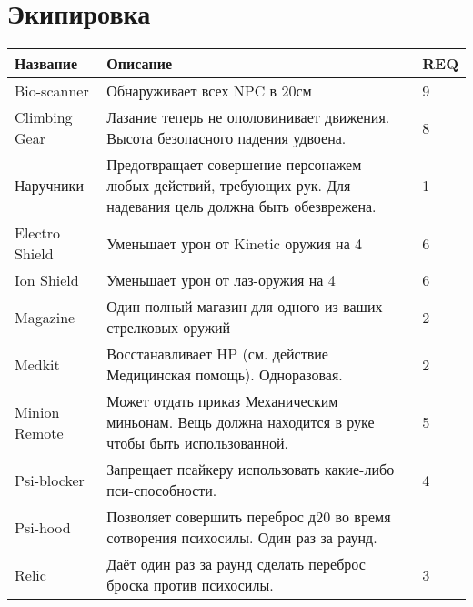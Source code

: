 \section*{Экипировка}
\begin{table}[h]
    \begin{tabularx}{\textwidth}{|l|X|l|}
    \hline
    Название       & Описание                                                                                                                 & REQ \\ \hline
    Bio-scanner    & Обнаруживает всех NPC в 20см                                                                                             & 9   \\ \hline
    Climbing Gear  & Лазание теперь не ополовинивает движения. Высота безопасного падения удвоена.                                            & 8   \\ \hline
    Наручники      & Предотвращает совершение персонажем любых действий, требующих рук. Для надевания цель должна быть обезврежена.           & 1   \\ \hline
    Electro Shield & Уменьшает урон от Kinetic оружия на 4                                                                                    & 6   \\ \hline
    Ion Shield     & Уменьшает урон от лаз-оружия на 4                                                                                        & 6   \\ \hline
    Magazine       & Один полный магазин для одного из ваших стрелковых оружий                                                                & 2   \\ \hline
    Medkit         & Восстанавливает HP (см. действие Медицинская помощь). Одноразовая.                                                       & 2   \\ \hline
    Minion Remote  & Может отдать приказ Механическим миньонам. Вещь должна находится в руке чтобы быть использованной.                       & 5   \\ \hline
    Psi-blocker    & Запрещает псайкеру использовать какие-либо пси-способности.                                                              & 4   \\ \hline
    Psi-hood       & Позволяет совершить переброс д20 во время сотворения психосилы. Один раз за раунд.                                       &     \\ \hline
    Relic          & Даёт один раз за раунд сделать переброс броска против психосилы.                                                         & 3   \\ \hline

\end{tabularx}
\end{table}
